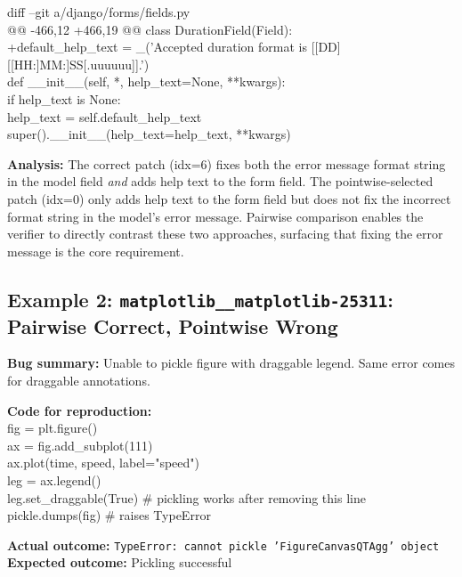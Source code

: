 \begin{tcolorbox}[
    colback=red!5,
    colframe=red!60!black,
    title={\textbf{Pointwise-Selected Patch (idx=0): Does not resolve the issue \ding{55}}},
    coltitle=white,
    fonttitle=\small\bfseries,
    breakable,
    enhanced
]
\small\ttfamily
diff --git a/django/forms/fields.py\\
@@ -466,12 +466,19 @@ class DurationField(Field):\\
+\quad default\_help\_text = \_('Accepted duration format is [[DD] [[HH:]MM:]SS[.uuuuuu]].')\\
\quad def \_\_init\_\_(self, *, help\_text=None, **kwargs):\\
\quad\quad if help\_text is None:\\
\quad\quad\quad help\_text = self.default\_help\_text\\
\quad\quad super().\_\_init\_\_(help\_text=help\_text, **kwargs)
\end{tcolorbox}

\noindent\textbf{Analysis:} The correct patch (idx=6) fixes both the error message format string in the model field \emph{and} adds help text to the form field. The pointwise-selected patch (idx=0) only adds help text to the form field but does not fix the incorrect format string in the model's error message. Pairwise comparison enables the verifier to directly contrast these two approaches, surfacing that fixing the error message is the core requirement.


\subsection{Example 2: \texttt{matplotlib\_\_matplotlib-25311}: Pairwise Correct, Pointwise Wrong}

\begin{tcolorbox}[
    colback=promptbg,
    colframe=promptborder,
    title={\textbf{Issue: Unable to pickle figure with draggable legend}},
    coltitle=white,
    fonttitle=\small\bfseries,
    breakable,
    enhanced
]
\small
\textbf{Bug summary:} Unable to pickle figure with draggable legend. Same error comes for draggable annotations.

\textbf{Code for reproduction:}\\
\ttfamily
fig = plt.figure()\\
ax = fig.add\_subplot(111)\\
ax.plot(time, speed, label="speed")\\
leg = ax.legend()\\
leg.set\_draggable(True)  \# pickling works after removing this line\\
pickle.dumps(fig)  \# raises TypeError\\
\rmfamily

\textbf{Actual outcome:} \texttt{TypeError: cannot pickle 'FigureCanvasQTAgg' object}\\
\textbf{Expected outcome:} Pickling successful
\end{tcolorbox}

